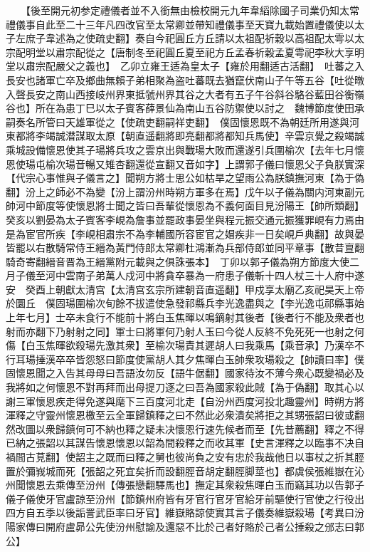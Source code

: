 　　【後至開元初参定禮儀者並不入銜無由檢校開元九年韋縚除國子司業仍知太常禮儀事自此至二十三年凡四改官至太常卿並帶知禮儀事至天寶九載始置禮儀使以太子左庶子韋述為之使疏史翻】奏自今祀圓丘方丘請以太祖配祈穀以高祖配太雩以太宗配明堂以肅宗配從之【唐制冬至祀圓丘夏至祀方丘孟春祈穀孟夏雩祀李秋大享明堂以肅宗配嚴父之義也】　乙卯立雍王适為皇太子【雍於用翻适古活翻】　吐蕃之入長安也諸軍亡卒及鄉曲無賴子弟相聚為盗吐蕃既去猶竄伏南山子午等五谷【吐從暾入聲長安之南山西接岐州界東抵虢州界其谷之大者有五子午谷斜谷駱谷藍田谷衡嶺谷也】所在為患丁巳以太子賓客薛景仙為南山五谷防禦使以討之　魏博節度使田承嗣奏名所管曰天雄軍從之【使疏吏翻嗣祥吏翻】　僕固懷恩既不為朝廷所用遂與河東都將李竭誠潜謀取太原【朝直遥翻將即亮翻都將都知兵馬使】辛雲京覺之殺竭誠乘城設備懷恩使其子瑒將兵攻之雲京出與戰瑒大敗而還遂引兵圍榆次【去年七月懷恩使瑒屯榆次瑒音暢又雉杏翻還從宣翻又音如字】上謂郭子儀曰懷恩父子負朕實深【代宗心事惟與子儀言之】聞朔方將士思公如枯旱之望雨公為朕鎮撫河東【為于偽翻】汾上之師必不為變【汾上謂汾州時朔方軍多在焉】戊午以子儀為關内河東副元帥河中節度等使懷恩將士聞之皆曰吾輩從懷恩為不義何面目見汾陽王【帥所類翻】　癸亥以劉晏為太子賓客李峴為詹事並罷政事晏坐與程元振交通元振獲罪峴有力焉由是為宦官所疾【李峴相肅宗不為李輔國所容宦官之媢疾非一日矣峴戶典翻】故與晏皆罷以右散騎常侍王縉為黃門侍郎太常卿杜鴻漸為兵部侍郎並同平章事【散昔亶翻騎奇寄翻縉音晋為王縉黨附元載與之俱誅張本】　丁卯以郭子儀為朔方節度大使二月子儀至河中雲南子弟萬人戍河中將貪卒暴為一府患子儀斬十四人杖三十人府中遂安　癸酉上朝獻太清宫【太清宫玄宗所建朝音直遥翻】甲戍享太廟乙亥祀昊天上帝於圜丘　僕固瑒圍榆次旬餘不拔遣使急發祁縣兵李光逸盡與之【李光逸屯祁縣事始上年七月】士卒未食行不能前十將白玉焦暉以鳴鏑射其後者【後者行不能及衆者也射而亦翻下乃射射之同】軍士曰將軍何乃射人玉曰今從人反終不免死死一也射之何傷【白玉焦暉欲殺瑒先激其衆】至榆次瑒責其遲胡人曰我乘馬【乘音承】乃漢卒不行耳瑒捶漢卒卒皆怨怒曰節度使黨胡人其夕焦暉白玉帥衆攻瑒殺之【帥讀曰率】僕固懷恩聞之入告其母母曰吾語汝勿反【語牛倨翻】國家待汝不薄今衆心既變禍必及我將如之何懷恩不對再拜而出母提刀逐之曰吾為國家殺此賊【為于偽翻】取其心以謝三軍懷恩疾走得免遂與麾下三百度河北走【自汾州西度河投北趣靈州】時朔方將渾釋之守靈州懷恩檄至云全軍歸鎮釋之曰不然此必衆潰矣將拒之其甥張韶曰彼或翻然改圖以衆歸鎮何可不納也釋之疑未决懷恩行速先候者而至【先昔薦翻】釋之不得已納之張韶以其謀告懷恩懷恩以韶為間殺釋之而收其軍【史言渾釋之以臨事不决自禍間古莧翻】使韶主之既而曰釋之舅也彼尚負之安有忠於我哉他日以事杖之折其脛置於彌峩城而死【張韶之死宜矣折而設翻脛音胡定翻脛脚莖也】都虞侯張維嶽在沁州聞懷恩去乘傳至汾州【傳張戀翻驛馬也】撫定其衆殺焦暉白玉而竊其功以告郭子儀子儀使牙官盧諒至汾州【節鎮州府皆有牙官行官牙官給牙前驅使行官使之行役出四方自五季以後詬詈武臣率曰牙官】維嶽賂諒使實其言子儀奏維嶽殺瑒【考異曰汾陽家傳曰開府盧昴公先使汾州慰諭及還惡不比於己者好賂於己者公捶殺之邠志曰郭公】

